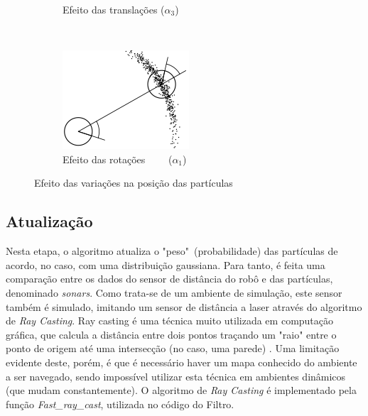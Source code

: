 \documentclass[
	12pt,				%
	openright,			%
	oneside,			%
	a4paper,			%
	english,			%
	french,				%
	spanish,			%
	brazil,				%
	]{abntex2}
\newcommand\todo[1]{~\newline{\color{red}\framebox[\columnwidth]{\parbox{.95\linewidth}{TODO: #1}}}~\newline}
\newcommand\todo[1]{}
\begin{document}
\begin{figure}[h!]
\begin{subfigure}[b]{0.25\textwidth}
        \caption{Efeito das translações ($\alpha_3$)}
        \label{fig:odom_variation_2}
    \end{subfigure}
    ~
    \begin{subfigure}[b]{0.25\textwidth}
        \includegraphics[width=\textwidth]{figs/odom_variation_3}
        \caption{Efeito das rotações ~~~~($\alpha_1$)}
        \label{fig:odom_variation_3}
    \end{subfigure}
    \caption{Efeito das variações na posição das partículas}
    \label{fig:odom_variation}
\end{figure}


\subsection{Atualização}
\label{subsec:atualização}
Nesta etapa, o algoritmo atualiza o "peso"~(probabilidade) das partículas de acordo, no caso, com uma distribuição gaussiana. Para tanto, é feita uma comparação entre os dados do sensor de distância do robô e das partículas, denominado \emph{sonars}. Como trata-se de um ambiente de simulação, este sensor também é simulado, imitando um sensor de distância a laser através do algoritmo de \emph{Ray Casting}. Ray casting é uma técnica muito utilizada em computação gráfica, que calcula a distância entre dois pontos traçando um "raio" entre o ponto de origem até uma intersecção (no caso, uma parede) \cite{raycasting}. Uma limitação evidente deste, porém, é que é necessário haver um mapa conhecido do ambiente a ser navegado, sendo impossível utilizar esta técnica em ambientes dinâmicos (que mudam constantemente). O algoritmo de \emph{Ray Casting} é implementado pela função \emph{Fast\_ray\_cast}, utilizada no código do Filtro.\par
\end{document}
